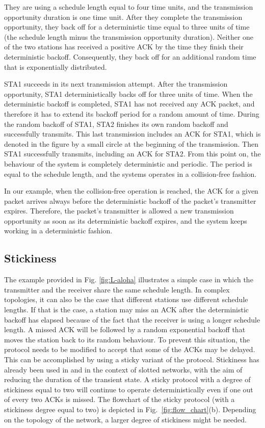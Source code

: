 \documentclass[twocolumn]{svjour3}          \smartqed  \usepackage{graphicx}
\begin{document}
They are using a schedule length equal to four time units, and the transmission opportunity duration is one time unit.
After they complete the transmission opportunity, they back off for a deterministic time equal to three units of time (the schedule length minus the transmission opportunity duration).
Neither one of the two stations has received a positive ACK by the time they finish their deterministic backoff.
Consequently, they back off for an additional random time that is exponentially distributed.

STA1 succeeds in its next transmission attempt.
After the transmission opportunity, STA1 deterministically backs off for three units of time.
When the deterministic backoff is completed, STA1 has not received any ACK packet, and therefore it has to extend its backoff period for a random amount of time.
During the random backoff of STA1, STA2 finishes its own random backoff and successfully transmits.
This last transmission includes an ACK for STA1, which is denoted in the figure by a small circle at the beginning of the transmission.
Then STA1 successfully transmits, including an ACK for STA2.
From this point on, the behaviour of the system is completely deterministic and periodic.
The period is equal to the schedule length, and the systems operates in a collision-free fashion.



In our example, when the collision-free operation is reached, the ACK for a given packet arrives always before the deterministic backoff of the packet's transmitter expires.
Therefore, the packet's transmitter is allowed a new transmission opportunity as soon as its deterministic backoff expires, and the system keeps working in a deterministic fashion.

\subsection{Stickiness}
\label{subsec:stickiness}

The example provided in Fig. \ref{fig:L-aloha} illustrates a simple case in which the transmitter and the receiver share the same schedule length.
In complex topologies, it can also be the case that different stations use different schedule lengths.
If that is the case, a station may miss an ACK after the deterministic backoff has elapsed because of the fact that the receiver is using a longer schedule length.
A missed ACK will be followed by a random exponential backoff that moves the station back to its random behaviour.
To prevent this situation, the protocol needs to be modified to accept that some of the ACKs may be delayed.
This can be accomplished by using a sticky variant of the protocol.
Stickiness has already been used in \cite{fang2010dlm} and \cite{barcelo2011tcf} in the context of slotted networks, with the aim of reducing the duration of the transient state.
A sticky protocol with a degree of stickiness equal to two will continue to operate deterministically even if one out of every two ACKs is missed.
The flowchart of the sticky protocol (with a stickiness degree equal to two) is depicted in Fig.~\ref{fig:flow_chart}(b).
Depending on the topology of the network, a larger degree of stickiness might be needed.
\end{document}

